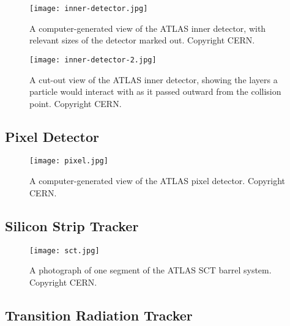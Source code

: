 
\begin{figure}
\centering
\texttt{[image: inner-detector.jpg]}
\label{fig:detector:inner-detector}
\caption{A computer-generated view of the ATLAS inner detector, with relevant sizes of the detector marked out. Copyright CERN.}
\end{figure}



\begin{figure}
\centering
\texttt{[image: inner-detector-2.jpg]}
\label{fig:detector:inner-detector-2}
\caption{A cut-out view of the ATLAS inner detector, showing the layers a particle would interact with as it passed outward from the collision point. Copyright CERN.}
\end{figure}


\subsection{Pixel Detector}


\begin{figure}
\centering
\texttt{[image: pixel.jpg]}
\label{fig:detector:pixel}
\caption{A computer-generated view of the ATLAS pixel detector. Copyright CERN.}
\end{figure}




\subsection{Silicon Strip Tracker}



\begin{figure}
\centering
\texttt{[image: sct.jpg]}
\label{fig:detector:sct}
\caption{A photograph of one segment of the ATLAS SCT barrel system. Copyright CERN.}
\end{figure}


\subsection{Transition Radiation Tracker}

